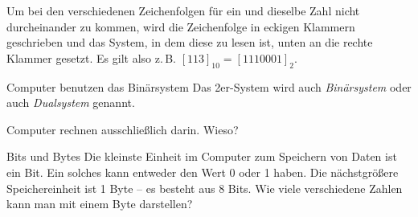 \documentclass{uebungszettel}
\begin{document}
Um bei den verschiedenen Zeichenfolgen für ein und dieselbe Zahl nicht durcheinander zu kommen, wird die Zeichenfolge in eckigen Klammern geschrieben und das System, in dem diese zu lesen ist, unten an die rechte Klammer gesetzt. Es gilt also z.\,B. $[113]_{10} = [1110001]_2$.

\begin{aufgabe}{Computer benutzen das Binärsystem}
Das 2er-System wird auch \emph{Binärsystem} oder auch \emph{Dualsystem} genannt.

Computer rechnen ausschließlich darin. Wieso?
\end{aufgabe}

\vspace{2 cm}
\begin{aufgabe}{Bits und Bytes}
 Die kleinste Einheit im Computer zum Speichern von Daten ist ein Bit.
 Ein solches kann entweder den Wert 0 oder 1 haben.
 Die nächstgrößere Speichereinheit ist 1 Byte -- es besteht aus 8 Bits.
 Wie viele verschiedene Zahlen kann man mit einem Byte darstellen?
\end{aufgabe}




\pagebreak
\end{document}
